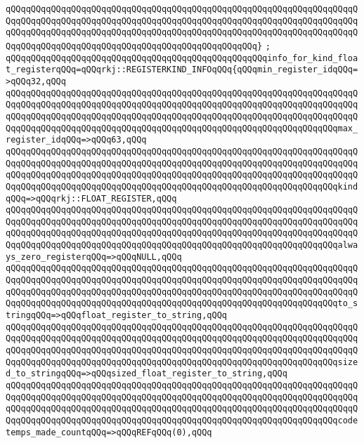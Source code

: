\verb|qQQqqQQqqQQqqQQqqQQqqQQqqQQqqQQqqQQqqQQqqQQqqQQqqQQqqQQqqQQqqQQqqQQqqQQqqQQqqQQqqQQqqQQqqQQqqQQqqQQqqQQqqQQqqQQqqQQqqQQqqQQqqQQqqQQqqQQqqQQqqQQqqQQqqQQqqQQqqQQqqQQqqQQqqQQqqQQqqQQqqQQqqQQqqQQqqQQqqQQqqQQqqQQqqQQqqQQqqQQqqQQqqQQqqQQqqQQqqQQqqQQqqQQqqQQqqQQqqQQq}|\newline
\verb|;|\newline
\verb|qQQqqQQqqQQqqQQqqQQqqQQqqQQqqQQqqQQqqQQqqQQqqQQqqQQqinfo_for_kind_float_registerqQQq=qQQqrkj::REGISTERKIND_INFOqQQq{qQQqmin_register_idqQQq=>qQQq32,qQQq|\newline
\verb|qQQqqQQqqQQqqQQqqQQqqQQqqQQqqQQqqQQqqQQqqQQqqQQqqQQqqQQqqQQqqQQqqQQqqQQqqQQqqQQqqQQqqQQqqQQqqQQqqQQqqQQqqQQqqQQqqQQqqQQqqQQqqQQqqQQqqQQqqQQqqQQqqQQqqQQqqQQqqQQqqQQqqQQqqQQqqQQqqQQqqQQqqQQqqQQqqQQqqQQqqQQqqQQqqQQqqQQqqQQqqQQqqQQqqQQqqQQqqQQqqQQqqQQqqQQqqQQqqQQqqQQqqQQqqQQqqQQqmax_register_idqQQq=>qQQq63,qQQq|\newline
\verb|qQQqqQQqqQQqqQQqqQQqqQQqqQQqqQQqqQQqqQQqqQQqqQQqqQQqqQQqqQQqqQQqqQQqqQQqqQQqqQQqqQQqqQQqqQQqqQQqqQQqqQQqqQQqqQQqqQQqqQQqqQQqqQQqqQQqqQQqqQQqqQQqqQQqqQQqqQQqqQQqqQQqqQQqqQQqqQQqqQQqqQQqqQQqqQQqqQQqqQQqqQQqqQQqqQQqqQQqqQQqqQQqqQQqqQQqqQQqqQQqqQQqqQQqqQQqqQQqqQQqqQQqqQQqqQQqqQQqkindqQQq=>qQQqrkj::FLOAT_REGISTER,qQQq|\newline
\verb|qQQqqQQqqQQqqQQqqQQqqQQqqQQqqQQqqQQqqQQqqQQqqQQqqQQqqQQqqQQqqQQqqQQqqQQqqQQqqQQqqQQqqQQqqQQqqQQqqQQqqQQqqQQqqQQqqQQqqQQqqQQqqQQqqQQqqQQqqQQqqQQqqQQqqQQqqQQqqQQqqQQqqQQqqQQqqQQqqQQqqQQqqQQqqQQqqQQqqQQqqQQqqQQqqQQqqQQqqQQqqQQqqQQqqQQqqQQqqQQqqQQqqQQqqQQqqQQqqQQqqQQqqQQqqQQqqQQqalways_zero_registerqQQq=>qQQqNULL,qQQq|\newline
\verb|qQQqqQQqqQQqqQQqqQQqqQQqqQQqqQQqqQQqqQQqqQQqqQQqqQQqqQQqqQQqqQQqqQQqqQQqqQQqqQQqqQQqqQQqqQQqqQQqqQQqqQQqqQQqqQQqqQQqqQQqqQQqqQQqqQQqqQQqqQQqqQQqqQQqqQQqqQQqqQQqqQQqqQQqqQQqqQQqqQQqqQQqqQQqqQQqqQQqqQQqqQQqqQQqqQQqqQQqqQQqqQQqqQQqqQQqqQQqqQQqqQQqqQQqqQQqqQQqqQQqqQQqqQQqqQQqqQQqto_stringqQQq=>qQQqfloat_register_to_string,qQQq|\newline
\verb|qQQqqQQqqQQqqQQqqQQqqQQqqQQqqQQqqQQqqQQqqQQqqQQqqQQqqQQqqQQqqQQqqQQqqQQqqQQqqQQqqQQqqQQqqQQqqQQqqQQqqQQqqQQqqQQqqQQqqQQqqQQqqQQqqQQqqQQqqQQqqQQqqQQqqQQqqQQqqQQqqQQqqQQqqQQqqQQqqQQqqQQqqQQqqQQqqQQqqQQqqQQqqQQqqQQqqQQqqQQqqQQqqQQqqQQqqQQqqQQqqQQqqQQqqQQqqQQqqQQqqQQqqQQqqQQqqQQqsized_to_stringqQQq=>qQQqsized_float_register_to_string,qQQq|\newline
\verb|qQQqqQQqqQQqqQQqqQQqqQQqqQQqqQQqqQQqqQQqqQQqqQQqqQQqqQQqqQQqqQQqqQQqqQQqqQQqqQQqqQQqqQQqqQQqqQQqqQQqqQQqqQQqqQQqqQQqqQQqqQQqqQQqqQQqqQQqqQQqqQQqqQQqqQQqqQQqqQQqqQQqqQQqqQQqqQQqqQQqqQQqqQQqqQQqqQQqqQQqqQQqqQQqqQQqqQQqqQQqqQQqqQQqqQQqqQQqqQQqqQQqqQQqqQQqqQQqqQQqqQQqqQQqqQQqqQQqcodetemps_made_countqQQq=>qQQqREFqQQq(0),qQQq|\newline
